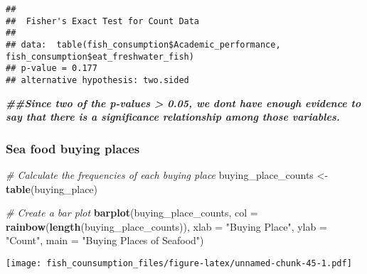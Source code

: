 \documentclass[
]{article}
\newenvironment{Shaded}{\begin{snugshade}}{\end{snugshade}}
\newcommand{\AttributeTok}[1]{\textcolor[rgb]{0.13,0.29,0.53}{#1}}
\newcommand{\CommentTok}[1]{\textcolor[rgb]{0.56,0.35,0.01}{\textit{#1}}}
\newcommand{\DocumentationTok}[1]{\textcolor[rgb]{0.56,0.35,0.01}{\textbf{\textit{#1}}}}
\newcommand{\FunctionTok}[1]{\textcolor[rgb]{0.13,0.29,0.53}{\textbf{#1}}}
\newcommand{\NormalTok}[1]{#1}
\newcommand{\OtherTok}[1]{\textcolor[rgb]{0.56,0.35,0.01}{#1}}
\newcommand{\StringTok}[1]{\textcolor[rgb]{0.31,0.60,0.02}{#1}}
\begin{document}
\begin{verbatim}
## 
##  Fisher's Exact Test for Count Data
## 
## data:  table(fish_consumption$Academic_performance, fish_consumption$eat_freshwater_fish)
## p-value = 0.177
## alternative hypothesis: two.sided
\end{verbatim}

\begin{Shaded}
\begin{Highlighting}[]
\DocumentationTok{\#\#Since two of the p{-}values \textgreater{} 0.05, we don\textquotesingle{}t have enough evidence to say that there is a significance relationship among those variables. }
\end{Highlighting}
\end{Shaded}

\hypertarget{sea-food-buying-places}{%
\subsubsection{Sea food buying places}\label{sea-food-buying-places}}

\begin{Shaded}
\begin{Highlighting}[]
\CommentTok{\# Calculate the frequencies of each buying place}
\NormalTok{buying\_place\_counts }\OtherTok{\textless{}{-}} \FunctionTok{table}\NormalTok{(buying\_place)}

\CommentTok{\# Create a bar plot}
\FunctionTok{barplot}\NormalTok{(buying\_place\_counts, }\AttributeTok{col =} \FunctionTok{rainbow}\NormalTok{(}\FunctionTok{length}\NormalTok{(buying\_place\_counts)), }
        \AttributeTok{xlab =} \StringTok{"Buying Place"}\NormalTok{, }\AttributeTok{ylab =} \StringTok{"Count"}\NormalTok{, }\AttributeTok{main =} \StringTok{"Buying Places of Seafood"}\NormalTok{)}
\end{Highlighting}
\end{Shaded}

\texttt{[image: fish\_counsumption\_files/figure-latex/unnamed-chunk-45-1.pdf]}
\end{document}
